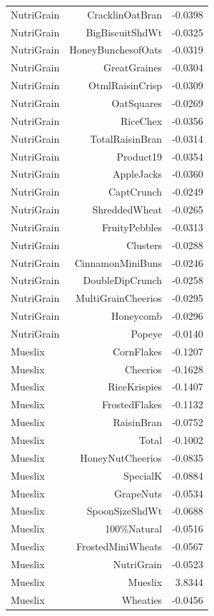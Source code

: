 \begin{longtable}{@{}lrr@{}}
NutriGrain & CracklinOatBran & -0.0398 \\
NutriGrain & BigBiscuitShdWt & -0.0325 \\
NutriGrain & HoneyBunchesofOats & -0.0319 \\
NutriGrain & GreatGraines & -0.0304 \\
NutriGrain & OtmlRaisinCrisp & -0.0309 \\
NutriGrain & OatSquares & -0.0269 \\
NutriGrain & RiceChex & -0.0356 \\
NutriGrain & TotalRaisinBran & -0.0314 \\
NutriGrain & Product19 & -0.0354 \\
NutriGrain & AppleJacks & -0.0360 \\
NutriGrain & CaptCrunch & -0.0249 \\
NutriGrain & ShreddedWheat & -0.0265 \\
NutriGrain & FruityPebbles & -0.0313 \\
NutriGrain & Clusters & -0.0288 \\
NutriGrain & CinnamonMiniBuns & -0.0246 \\
NutriGrain & DoubleDipCrunch & -0.0258 \\
NutriGrain & MultiGrainCheerios & -0.0295 \\
NutriGrain & Honeycomb & -0.0296 \\
NutriGrain & Popeye & -0.0140 \\
Mueslix & CornFlakes & -0.1207 \\
Mueslix & Cheerios & -0.1628 \\
Mueslix & RiceKrispies & -0.1407 \\
Mueslix & FrostedFlakes & -0.1132 \\
Mueslix & RaisinBran & -0.0752 \\
Mueslix & Total & -0.1002 \\
Mueslix & HoneyNutCheerios & -0.0835 \\
Mueslix & SpecialK & -0.0884 \\
Mueslix & GrapeNuts & -0.0534 \\
Mueslix & SpoonSizeShdWt & -0.0688 \\
Mueslix & 100\%Natural & -0.0516 \\
Mueslix & FrostedMiniWheats & -0.0567 \\
Mueslix & NutriGrain & -0.0523 \\
Mueslix & Mueslix & 3.8344 \\
Mueslix & Wheaties & -0.0456 \\

\end{longtable}
